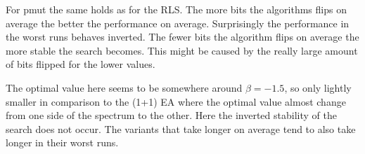 For pmut the same holds as for the RLS.
The more bits the algorithms flips on average the better the performance on average.
Surprisingly the performance in the worst runs behaves inverted.
The fewer bits the algorithm flips on average the more stable the search becomes.
This might be caused by the really large amount of bits flipped for the lower values.



The optimal value here seems to be somewhere around $\beta=-1.5$, so only lightly smaller in comparison to the (1+1) EA where the optimal value almost change from one side of the spectrum to the other.
Here the inverted stability of the search does not occur.
The variants that take longer on average tend to also take longer in their worst runs.

